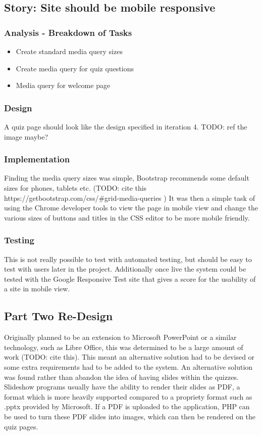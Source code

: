 \subsection{Story: Site should be mobile responsive}
\subsubsection{Analysis - Breakdown of Tasks}
\begin{itemize}
	\item Create standard media query sizes
	\item Create media query for quiz questions
	\item Media query for welcome page
\end{itemize}
\subsubsection{Design}
A quiz page should look like the design specified in iteration 4. TODO: ref the image maybe?
\subsubsection{Implementation}
Finding the media query sizes was simple, Bootstrap recommends some default sizes for phones, tablets etc. (TODO: cite this https://getbootstrap.com/css/\#grid-media-queries ) It was then a simple task of using the Chrome developer tools to view the page in mobile view and change the various sizes of buttons and titles in the CSS editor to be more mobile friendly.
\subsubsection{Testing}
This is not really possible to test with automated testing, but should be easy to test with users later in the project. Additionally once live the system could be tested with the Google Responsive Test site that gives a score for the usability of a site in mobile view.
\newpage

\subsection{Part Two Re-Design}
Originally planned to be an extension to Microsoft PowerPoint or a similar technology, such as Libre Office, this was determined to be a large amount of work (TODO: cite this). This meant an alternative solution had to be devised or some extra requirements had to be added to the system. An alternative solution was found rather than abandon the idea of having slides within the quizzes. Slideshow programs usually have the ability to render their slides as PDF, a format which is more heavily supported compared to a propriety format such as .pptx provided by Microsoft. If a PDF is uploaded to the application, PHP can be used to turn these PDF slides into images, which can then be rendered on the quiz pages.

